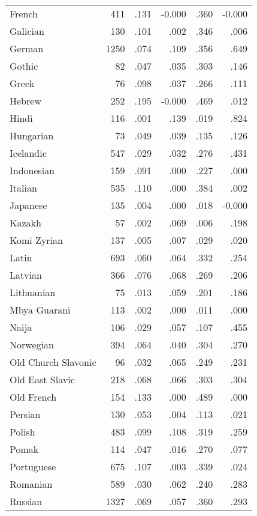 \begin{longtable}{lrrrrr}
    French & 411 & .131 & -0.000 & .360 & -0.000 \\
    Galician & 130 & .101 & .002 & .346 & .006 \\
    German & 1250 & .074 & .109 & .356 & .649 \\
    Gothic & 82 & .047 & .035 & .303 & .146 \\
    Greek & 76 & .098 & .037 & .266 & .111 \\
    Hebrew & 252 & .195 & -0.000 & .469 & .012 \\
    Hindi & 116 & .001 & .139 & .019 & .824 \\
    Hungarian & 73 & .049 & .039 & .135 & .126 \\
    Icelandic & 547 & .029 & .032 & .276 & .431 \\
    Indonesian & 159 & .091 & .000 & .227 & .000 \\
    Italian & 535 & .110 & .000 & .384 & .002 \\
    Japanese & 135 & .004 & .000 & .018 & -0.000 \\
    Kazakh & 57 & .002 & .069 & .006 & .198 \\
    Komi Zyrian & 137 & .005 & .007 & .029 & .020 \\
    Latin & 693 & .060 & .064 & .332 & .254 \\
    Latvian & 366 & .076 & .068 & .269 & .206 \\
    Lithuanian & 75 & .013 & .059 & .201 & .186 \\
    Mbya Guarani & 113 & .002 & .000 & .011 & .000 \\
    Naija & 106 & .029 & .057 & .107 & .455 \\
    Norwegian & 394 & .064 & .040 & .304 & .270 \\
    Old Church Slavonic & 96 & .032 & .065 & .249 & .231 \\
    Old East Slavic & 218 & .068 & .066 & .303 & .304 \\
    Old French & 154 & .133 & .000 & .489 & .000 \\
    Persian & 130 & .053 & .004 & .113 & .021 \\
    Polish & 483 & .099 & .108 & .319 & .259 \\
    Pomak & 114 & .047 & .016 & .270 & .077 \\
    Portuguese & 675 & .107 & .003 & .339 & .024 \\
    Romanian & 589 & .030 & .062 & .240 & .283 \\
    Russian & 1327 & .069 & .057 & .360 & .293 \\

\end{longtable}
